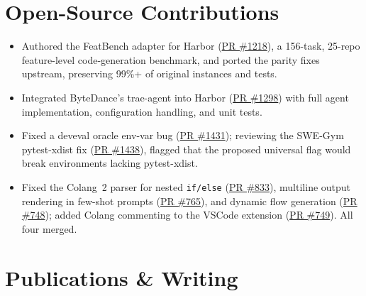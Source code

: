 \documentclass[11pt,letterpaper]{article}
\begin{document}
\newpage

\section*{Open-Source Contributions}

\begin{itemize}
  \item Authored the FeatBench adapter for Harbor (\href{https://github.com/harbor-framework/harbor/pull/1218}{PR \#1218}), a 156-task, 25-repo feature-level code-generation benchmark, and ported the parity fixes upstream, preserving 99\%+ of original instances and tests.
  \item Integrated ByteDance's trae-agent into Harbor (\href{https://github.com/harbor-framework/harbor/pull/1298}{PR \#1298}) with full agent implementation, configuration handling, and unit tests.
  \item Fixed a deveval oracle env-var bug (\href{https://github.com/harbor-framework/harbor/pull/1431}{PR \#1431}); reviewing the SWE-Gym pytest-xdist fix (\href{https://github.com/harbor-framework/harbor/pull/1438}{PR \#1438}), flagged that the proposed universal flag would break environments lacking pytest-xdist.
\end{itemize}

\begin{itemize}
  \item Fixed the Colang~2 parser for nested \texttt{if/else} (\href{https://github.com/NVIDIA-NeMo/Guardrails/pull/833}{PR \#833}), multiline output rendering in few-shot prompts (\href{https://github.com/NVIDIA-NeMo/Guardrails/pull/765}{PR \#765}), and dynamic flow generation (\href{https://github.com/NVIDIA-NeMo/Guardrails/pull/748}{PR \#748}); added Colang commenting to the VSCode extension (\href{https://github.com/NVIDIA-NeMo/Guardrails/pull/749}{PR \#749}). All four merged.
\end{itemize}

\section*{Publications \& Writing}
\end{document}
